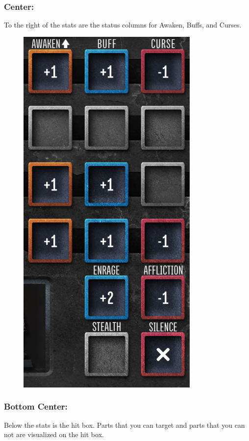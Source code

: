 \documentclass[../main.tex]{subfiles}
\begin{document}
\subsubsection{Center:}
To the right of the stats are the status columns for Awaken, Buffs, and Curses. 
\tsgap
\begin{figure}[h]
    \includegraphics[width=0.8\linewidth]{chapters//charactercard/TimeStrikeCharCardStatusColumns.png}
\end{figure}

\subsubsection{Bottom Center:}
Below the stats is the hit box.   Parts that you can target and parts that you can not are visualized on the hit box. 
\tsgap
\end{document}
